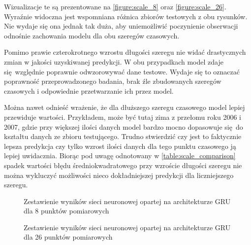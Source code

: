 \documentclass[10pt,a4paper]{article}
\begin{document}
Wizualizacje te są prezentowane na \autoref{figure:scale_8} oraz \autoref{figure:scale_26}. Wyraźnie widoczna jest wspomniana różnica zbiorów testowych z obu rysunków. Nie wydaje się ona jednak tak duża, aby uniemożliwić poczynienie obserwacji odnośnie zachowania modelu dla obu szeregów czasowych.

Pomimo prawie czterokrotnego wzrostu długości szeregu nie widać drastycznych zmian w jakości uzyskiwanej predykcji. W obu przypadkach model zdaje się względnie poprawnie odwzorowywać dane testowe. Wydaje się to oznaczać poprawność przeprowadzonego badania, brak źle zbudowanych szeregów czasowych i odpowiednie przetwarzanie ich przez model. 

Można nawet odnieść wrażenie, że dla dłuższego szeregu czasowego model lepiej przewiduje wartości. Przykładem, może być tutaj zima z przełomu roku 2006 i 2007, gdzie przy większej ilości danych model bardzo mocno dopasowuje się do kształtu danych ze zbioru testującego. Trudno stwierdzić czy jest to faktycznie lepsza predykcja czy tylko wzrost ilości danych dla tego punktu czasowego ją lepiej uwidacznia. Biorąc pod uwagę odnotowany w \autoref{table:scale_comparison} spadek wartości błędu średniokwadratowego przy wzroście długości szeregu nie można wykluczyć możliwości nieco dokładniejszej predykcji dla liczniejszego szeregu. 

\begin{figure}[!ht]
	\centering
	\caption{Zestawienie wyników sieci neuronowej opartej na architekturze GRU dla 8 punktów pomiarowych}
	\label{figure:scale_8}
\end{figure}
\FloatBarrier

\begin{figure}[!ht]
	\centering
	\caption{Zestawienie wyników sieci neuronowej opartej na architekturze GRU dla 26 punktów pomiarowych}
	\label{figure:scale_26}
\end{figure}
\FloatBarrier
\end{document}
